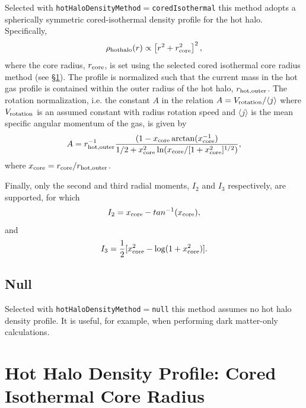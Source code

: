 Selected with {\tt hotHaloDensityMethod}$=${\tt coredIsothermal} this method adopts a spherically symmetric cored-isothermal density profile for the hot halo. Specifically,
\begin{equation}
 \rho_{\rm hot halo}(r) \propto \left[ r^2 + r_{\rm core}^2 \right]^2,
\end{equation}
where the core radius, $r_{\rm core}$, is set using the selected cored isothermal core radius method (see \S\ref{sec:hotHaloDensityProfileCoredIsothermalCoreRadius}). The profile is normalized such that the current mass in the hot gas profile is contained within the outer radius of the hot halo, $r_{\rm hot, outer}$. The rotation normalization, i.e. the constant $A$ in the relation $A = V_{\rm rotation}/\langle j \rangle$ where $V_{\rm rotation}$ is an assumed constant with radius rotation speed and $\langle j \rangle$ is the mean specific angular momentum of the gas, is given by
\begin{equation}
A = r_{\rm hot, outer}^{-1} {(1-x_{\rm core}\arctan(x_{\rm core}^{-1}) \over 1/2 + x_{\rm core}^2 \ln(x_{\rm core}/[1+x_{\rm core}^2]^{1/2})},
\end{equation}
where $x_{\rm core}=r_{\rm core}/r_{\rm hot, outer}$.

Finally, only the second and third radial moments, $I_2$ and $I_3$ respectively, are supported, for which
\begin{equation}
I_2 = x_{\rm core}-tan^{-1}(x_{\rm core}),
\end{equation}
and
\begin{equation}
I_3 = {1 \over 2} [x_{\rm core}^2-\log(1+x_{\rm core}^2)].
\end{equation}

\subsection{Null}

Selected with {\tt hotHaloDensityMethod}$=${\tt null} this method assumes no hot halo density profile. It is useful, for example, when performing dark matter-only calculations.

\section{Hot Halo Density Profile: Cored Isothermal Core Radius}\label{sec:hotHaloDensityProfileCoredIsothermalCoreRadius}

